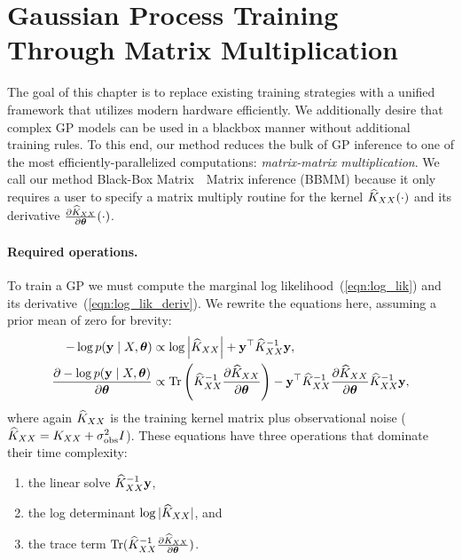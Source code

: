 \section{Gaussian Process Training Through Matrix Multiplication}

\label{sec:bbmm_method}
The goal of this chapter is to replace existing training strategies with a unified framework that utilizes modern hardware efficiently.
We additionally desire that complex GP models can be used in a blackbox manner without additional training rules.
To this end, our method reduces the bulk of GP inference to one of the most efficiently-parallelized computations: \emph{matrix-matrix multiplication}.
We call our method Black-Box Matrix~\texttimes~Matrix inference (BBMM) because it only requires a user to specify a matrix multiply routine for the kernel $\widehat{K}_{XX} ( \cdot )$ and its derivative $\frac{\partial \widehat{K}_{XX}}{\partial \boldsymbol{\theta}} ( \cdot )$.

\paragraph{Required operations.}
To train a GP we must compute the marginal log likelihood~(\cref{eqn:log_lik}) and its derivative~(\cref{eqn:log_lik_deriv}).
We rewrite the equations here, assuming a prior mean of zero for brevity:
\begin{align*}
  -\log p( \by \mid \bX, \btheta)
  &\propto \log \left \vert \trainK \right \vert + \by^{\top} \trainK^{-1} \by,
  \\
  \frac{\partial - \log p( \by \mid \bX, \btheta )}{\partial \btheta}
  &\propto
   \tr{\trainK^{-1}\frac{\partial \trainK}{\partial \btheta}} -
	\by^{\top} \trainK^{-1}\frac{\partial \trainK}{\partial \btheta}\trainK^{-1} \by,
\end{align*}
where again $\widehat{K}_{XX}$ is the training kernel matrix plus observational noise ($\widehat{K}_{XX} = K_{XX} + \sigma^2_\text{obs} I$).
These equations have three operations that dominate their time complexity:
\begin{enumerate}
  \item the linear solve $\widehat{K}_{XX}^{-1}\mathbf{y}$,
  \item the log determinant $\log \vert \widehat{K}_{XX} \vert$, and
  \item the trace term $\tr{\trainK^{-1}\frac{\partial \trainK}{\partial \btheta}}$.
\end{enumerate}

